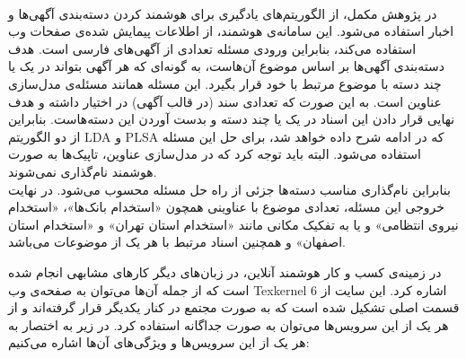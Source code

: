 \\
در پژوهش مکمل، از الگوریتم‌های یادگیری برای هوشمند کردن دسته‌بندی آگهی‌ها و اخبار استفاده می‌شود. این سامانه‌ی هوشمند، از اطلاعات پیمایش شده‌ی صفحات وب استفاده می‌کند، بنابراین ورودی مسئله تعدادی از آگهی‌های فارسی است. هدف دسته‌بندی آگهی‌ها بر اساس موضوع آن‌هاست، به گونه‌ای که هر آگهی بتواند در یک یا چند دسته با موضوع مرتبط با خود قرار بگیرد. این مسئله همانند مسئله‌ی مدل‌سازی عناوین است. به این صورت که تعدادی سند (در قالب آگهی) در اختیار داشته و هدف نهایی قرار دادن این اسناد در یک یا چند دسته و بدست آوردن این دسته‌هاست. بنابراین از دو الگوریتم LDA و PLSA که در ادامه شرح داده خواهد شد، برای حل این مسئله استفاده می‌شود. البته باید توجه کرد که در مدل‌سازی عناوین، تاپیک‌ها به صورت هوشمند نام‌گذاری نمی‌شوند. 
\\
بنابراین نام‌گذاری مناسب دسته‌ها جزئی از راه حل مسئله محسوب می‌شود. در نهایت خروجی این مسئله، تعدادی موضوع با عناوینی همچون «استخدام بانک‌ها»، «استخدام نیروی انتظامی» و یا به تفکیک مکانی مانند «استخدام استان تهران» و «استخدام استان اصفهان» و همچنین اسناد مرتبط با هر یک از موضوعات می‌باشد.


در زمینه‌ی کسب و کار هوشمند آنلاین، در زبان‌های دیگر کارهای مشابهی انجام شده است که از جمله آن‌ها می‌توان به صفحه‌ی وب Texkernel اشاره کرد. این سایت از 6 قسمت اصلی تشکیل شده است که به صورت مجتمع در کنار یکدیگر قرار گرفته‌اند و از هر یک از این سرویس‌ها می‌توان به صورت جداگانه استفاده کرد. در زیر به اختصار به هر یک از این سرویس‌ها و ویژگی‌های آن‌ها اشاره می‌کنیم:





